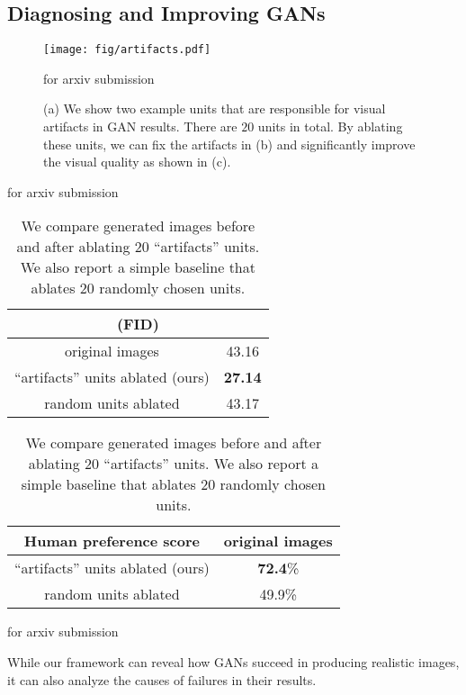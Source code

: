 \documentclass{article} %
\def\arxiv{for arxiv submission}
\begin{document}
\subsection{Diagnosing and Improving GANs}\begin{figure}[t]
\texttt{[image: fig/artifacts.pdf]}
\vspace{-20pt}
\caption{(a) We show two example  units that are responsible for visual artifacts in GAN results. There are $20$ units in total. By ablating these units,  we can fix the artifacts in (b) and significantly improve the visual quality as shown in (c).}
\ifdefined\arxiv
\vspace{-10pt}
\else
\vspace{-5pt}
\fi
\end{figure}\begin{table}[t]
	\small
\ifdefined\arxiv
	\vspace{-20pt}
	\else
	\fi
	\centering
	\caption{We compare generated images before and after ablating $20$ ``artifacts'' units. We also report a simple baseline that ablates $20$ randomly chosen units.}
		\vspace{-5pt}

	\begin{tabularx}{175pt}{cc}
		\toprule
	 \multicolumn{2}{c}{\fid (FID)}	\tabularnewline\midrule
original images		  & 43.16    	\tabularnewline
		``artifacts'' units ablated (ours)		  & {\bf 27.14}   		\tabularnewline
		random units ablated      & 43.17
		\tabularnewline\bottomrule
	\end{tabularx}\quad
	\begin{tabularx}{210pt}{cc}
		\toprule
		Human preference score  & original images  \tabularnewline\midrule
		``artifacts'' units ablated (ours) 	  & {\bf 72.4}\% \tabularnewline
		random units ablated   &  49.9\% 
		\tabularnewline\bottomrule
	\end{tabularx}
    \ifdefined\arxiv

    \else
    \vspace{-10pt}
    \fi
\end{table}
While our framework can reveal how GANs succeed in producing realistic images, it can also analyze the causes of failures in their results. %
\end{document}
